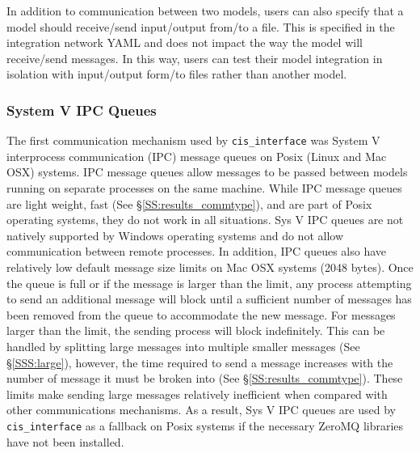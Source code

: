 \documentclass[journal]{IEEEtran}
\newcommand{\cis}{{\tt cis\_interface}{}}
\begin{document}
In addition to communication between two models, users can also specify that a 
model should receive/send input/output from/to a file. This is specified in 
the integration network YAML and does not impact the way the model will 
receive/send messages. In this way, users can test their model integration in 
isolation with input/output form/to files rather than another model.

\subsubsection{System V IPC Queues}\label{SSS:ipc}
%
The first communication mechanism used by {\cis} was System V interprocess 
communication (IPC) message queues \citep{Rusling1999} on Posix (Linux and Mac OSX) systems. 
IPC message queues allow messages to be passed between models running on separate 
processes on the same machine. While IPC message queues are light weight, fast 
(See \S\ref{SS:results_commtype}), and are part of Posix operating systems, they do not work in all 
situations. Sys V IPC queues are not natively supported by Windows operating systems 
and do not allow communication between remote processes. In addition, IPC queues also 
have relatively low default message size limits on Mac OSX systems (2048 bytes). Once 
the queue is full or if the message is larger than the limit, any process attempting to send an additional message will block until a 
sufficient number of messages has been removed from the queue to accommodate the new message. 
For messages larger than the limit, the sending process will block indefinitely. 
This can be handled by splitting large messages into multiple smaller messages 
(See \S\ref{SSS:large}), however, the time required to send a message increases with the number of 
message it must be broken into (See \S\ref{SS:results_commtype}). These limits make sending large messages 
relatively inefficient when compared with other communications mechanisms. 
As a result, Sys V IPC queues are used by 
{\cis} as a fallback on Posix systems if the necessary ZeroMQ libraries have 
not been installed.

\end{document}
